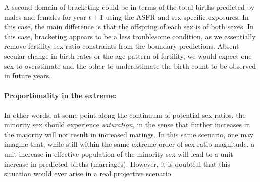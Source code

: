A second domain of bracketing could be in terms of the total births predicted by
males and females for year $t+1$ using the ASFR and sex-specific exposures. In
this case, the main difference is that the offspring of each sex is of both
sexes. In this case, bracketing appears to be a less troublesome condition, as
we essentially remove fertility sex-ratio constraints from the boundary
predictions. Absent secular change in birth rates or the age-pattern of fertility, 
we would expect one sex to overstimate and the other to underestimate the birth
count to be observed in future years. 

\paragraph{Proportionality in the extreme:} In other words, at some point along
the continuum of potential sex ratios, the minority sex should experience
\textit{saturation}, in the sense that further increases in the majority will
not result in increased matings. In this same scenario, one may imagine that,
while still within the same extreme order of sex-ratio magnitude, a unit
increase in effective population of the minority sex will lead to a unit
increase in predicted births (marriages). However, it is doubtful that this
situation would ever arise in a real projective scenario. 
